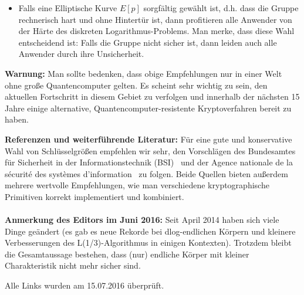\begin{refsegment}
\begin{itemize}
\item Falls eine Elliptische Kurve $E[p]$ sorgfältig gewählt ist, d.h. dass die Gruppe rechnerisch hart und ohne Hintertür ist, dann profitieren alle Anwender von der Härte des diskreten Logarithmus-Problems. Man merke, dass diese Wahl entscheidend ist: Falls die Gruppe nicht sicher ist, dann leiden auch alle Anwender durch ihre Unsicherheit.
\end{itemize}

\noindent \textbf{Warnung:} Man sollte bedenken, dass obige Empfehlungen nur in einer Welt ohne große Quantencomputer gelten.
 Es scheint sehr wichtig zu sein, den aktuellen Fortschritt in diesem Gebiet zu verfolgen und innerhalb der nächsten 15 Jahre einige alternative, Quantencomputer-resistente Kryptoverfahren bereit zu haben.

\noindent \textbf{Referenzen und weiterführende Literatur:}
Für eine gute und konservative Wahl von Schlüsselgrößen empfehlen wir sehr, den Vorschlägen des Bundesamtes f\"ur Sicherheit in der Informationstechnik (BSI)~\cite{BSI2012} und der Agence nationale de la s\'ecurit\'e des syst\`emes d'informa\-tion~\cite{refanssi2013} zu folgen. Beide Quellen bieten außerdem mehrere wertvolle Empfehlungen, wie man verschiedene kryptographische Primitiven korrekt implementiert und kombiniert.\\\\

\noindent \textbf{Anmerkung des Editors im Juni 2016:}
Seit April 2014 haben sich viele Dinge geändert (es gab es neue Rekorde bei dlog-endlichen Körpern und kleinere Verbesserungen des L(1/3)-Algorithmus in einigen Kontexten). Trotzdem bleibt die Gesamtaussage bestehen, dass (nur) endliche Körper mit kleiner Charakteristik nicht mehr sicher sind.



\printbibliography[%
	heading=subbibintoc,
	title={Literatur zu Kapitel \thechapter},
	segment=\therefsegment,
]
\end{refsegment}


\noindent Alle Links wurden am 15.07.2016 überprüft.



